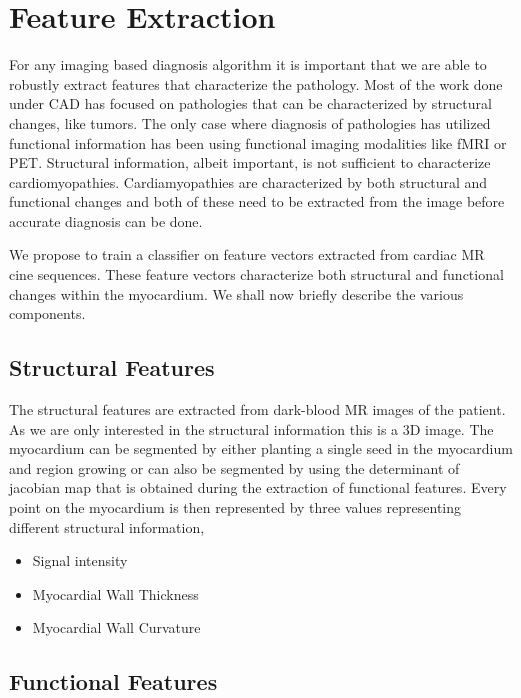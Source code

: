 \section {Feature Extraction}
\label{feature} 

For any imaging based diagnosis algorithm it is important that we are able to robustly extract features that characterize the pathology. Most of the work done under CAD has focused on pathologies that can be characterized by structural changes, like tumors. The only case where diagnosis of pathologies has utilized functional information has been using functional imaging modalities like fMRI or PET. Structural information, albeit important, is not sufficient to characterize cardiomyopathies. Cardiamyopathies are characterized by both structural and functional changes and both of these need to be extracted from the image before accurate diagnosis can be done. 

We propose to train a classifier on feature vectors extracted from cardiac MR cine sequences. These feature vectors characterize both structural and functional changes within the myocardium. We shall now briefly describe the various components.

\subsection{Structural Features}

The structural features are extracted from dark-blood MR images of the patient. As we are only interested in the structural information this is a 3D image. The myocardium can be segmented by either planting a single seed in the myocardium and region growing or can also be segmented by using the determinant of jacobian map that is obtained during the extraction of functional features. Every point on the myocardium is then represented by three values representing different structural information,

\begin{itemize}
  \item Signal intensity

  \item Myocardial Wall Thickness

  \item Myocardial Wall Curvature
\end{itemize}

\subsection{Functional Features}

